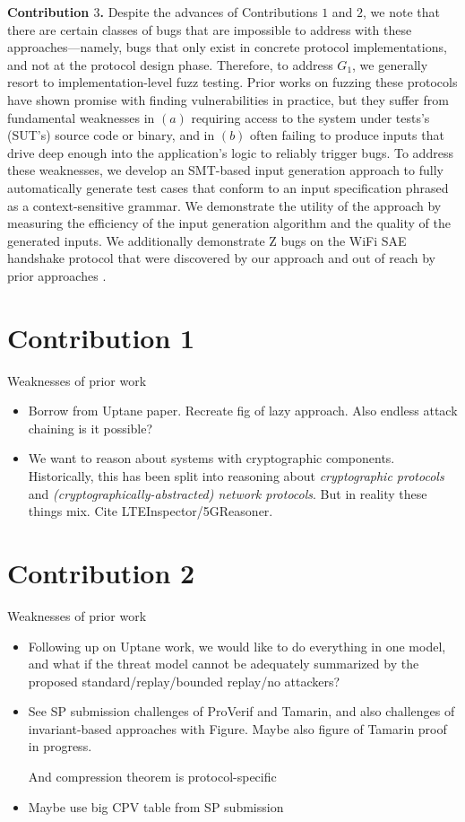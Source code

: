 \documentclass{article}
\theoremstyle{definition}
\begin{document}
\noindent\textbf{Contribution $3$.}
Despite the advances of Contributions $1$ and $2$, we note that there are certain classes of 
bugs that are impossible to address with these approaches---namely, bugs that only exist 
in concrete protocol implementations, and not at the protocol design phase. 
Therefore, to address $G_1$, we generally resort to implementation-level fuzz testing. 
Prior works on fuzzing these protocols have shown promise with finding vulnerabilities in practice, 
but they suffer from fundamental weaknesses in $(a)$ requiring access to the system under tests's (SUT's)
source code or binary, and in $(b)$ often failing to produce inputs that drive deep enough 
into the application's logic to reliably trigger bugs.
To address these weaknesses, we develop an SMT-based input generation approach 
to fully automatically generate test cases that conform to an input specification 
phrased as a context-sensitive grammar.
We demonstrate the utility of the approach by measuring the efficiency of the input generation 
algorithm and the quality of the generated inputs. 
We additionally demonstrate Z bugs on the WiFi SAE handshake protocol that were 
discovered by our approach and out of reach by prior approaches \cite{saecred}.

\section {Contribution 1}
Weaknesses of prior work
\begin{itemize}
  \item Borrow from Uptane paper. Recreate fig of lazy approach. Also endless attack chaining is it possible?
  \item We want to reason about systems with cryptographic components. Historically, this has been split 
  into reasoning about \emph{cryptographic protocols} and \emph{(cryptographically-abstracted) network protocols}. 
  But in reality these things mix. Cite LTEInspector/5GReasoner.
\end{itemize}

\section {Contribution 2}
Weaknesses of prior work
\begin{itemize}
    \item 
  Following up on Uptane work,
  we would like to do everything in one model, and what if the threat model cannot be adequately 
  summarized by the proposed standard/replay/bounded replay/no attackers?
  \item See SP submission challenges of ProVerif and Tamarin, and also challenges of invariant-based 
  approaches with Figure. Maybe also figure of Tamarin proof in progress.

  And compression theorem is protocol-specific
  \item Maybe use big CPV table from SP submission
\end{itemize}
\end{document}
